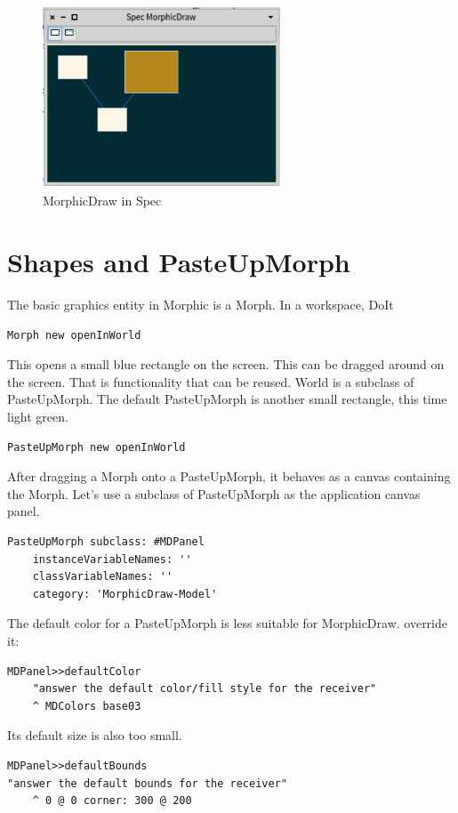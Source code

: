 \documentclass[10pt]{article}   	%
\begin{document}
\begin{figure}[htb]
\begin{center}
\includegraphics[width=200pt]{SpecMorphicDraw.png}
\caption{MorphicDraw in Spec}
\label{spec}
\end{center}
\end{figure}
\section{Shapes and PasteUpMorph}
The basic graphics entity in Morphic is a Morph. In a workspace, DoIt
\begin{verbatim}
Morph new openInWorld
\end{verbatim}
This opens a small blue rectangle on the screen. This can be dragged around on 
the screen. That is functionality that can be reused. World is a subclass of 
PasteUpMorph. The default PasteUpMorph is another small rectangle, this
time light green. 
\begin{verbatim}
PasteUpMorph new openInWorld
\end{verbatim}
After dragging a Morph onto a PasteUpMorph, it behaves as
a canvas containing the Morph. Let's use a subclass of PasteUpMorph
as the application canvas panel. 
\begin{verbatim}
PasteUpMorph subclass: #MDPanel
    instanceVariableNames: ''
    classVariableNames: ''
    category: 'MorphicDraw-Model'
\end{verbatim}
The default color for a PasteUpMorph is less suitable for MorphicDraw.
override it:
\begin{verbatim}
MDPanel>>defaultColor
    "answer the default color/fill style for the receiver"
    ^ MDColors base03
\end{verbatim}
Its default size is also too small.
\begin{verbatim}
MDPanel>>defaultBounds
"answer the default bounds for the receiver"
    ^ 0 @ 0 corner: 300 @ 200
\end{verbatim}
\end{document}
